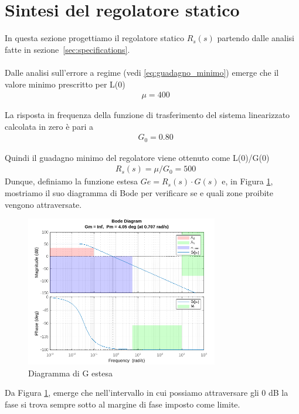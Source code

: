 \documentclass[a4paper, 11pt]{article}
\begin{document}
\section{Sintesi del regolatore statico}
\label{sec:static_regulator}
%
    In questa sezione progettiamo il regolatore statico $R_s(s)$ partendo dalle analisi fatte in sezione~\ref{sec:specifications}.
    \\\\
%
    Dalle analisi sull'errore a regime (vedi \ref{eq:guadagno_minimo}) emerge che il valore minimo prescritto per L(0) 
    \begin{subequations}
    \begin{align*}
        &\mu = 400
    \end{align*}
    \end{subequations}
    
    La risposta in frequenza della funzione di trasferimento del sistema linearizzato calcolata in zero è pari a
    \begin{subequations}
    \begin{align*}
        &G_0 = 0.80
    \end{align*}
    \end{subequations}

    Quindi il guadagno minimo del regolatore viene ottenuto come L(0)/G(0)
    \begin{align*}
         &R_s(s) = \mu / G_0 = 500
    \end{align*}
%
    Dunque, definiamo la funzione estesa $Ge = R_s(s) \cdot G(s)$ e, in Figura \ref{fig:static_regulator}, mostriamo il suo diagramma di Bode per verificare se e quali zone proibite vengono attraversate.
    
\begin{figure}[H]
    \centering
    \includegraphics[width=0.75\textwidth]{immagini/regolatore_statico.png}
    \caption{Diagramma di G estesa}
    \label{fig:static_regulator}
\end{figure}
%
    Da Figura \ref{fig:static_regulator}, emerge che nell'intervallo 
    in cui possiamo attraversare gli 0 dB la fase si trova sempre sotto al margine di fase imposto come limite.
\end{document}
